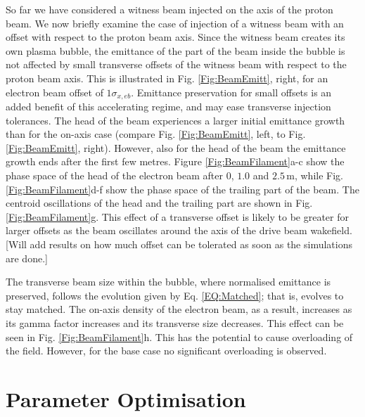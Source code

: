 \documentclass[aps,prstab,reprint,amsmath,amssymb,groupedaddress]{revtex4-1}
\newcommand{\unit}[1]{\,\mathrm{#1}}
\begin{document}
So far we have considered a witness beam injected on the axis of the proton beam. We now briefly examine the case of
injection of a witness beam with an offset with respect to the proton beam axis. Since the witness beam creates its own
plasma bubble, the emittance of the part of the beam inside the bubble is not affected by small transverse offsets of
the witness beam with respect to the proton beam axis. This is illustrated in Fig. \ref{Fig:BeamEmitt}, right, for an
electron beam offset of $1\sigma_{x,eb}$. Emittance preservation for small offsets is an added benefit of this
accelerating regime, and may ease transverse injection tolerances. The head of the beam experiences a larger initial
emittance growth than for the on-axis case (compare Fig. \ref{Fig:BeamEmitt}, left, to Fig. \ref{Fig:BeamEmitt}, right).
However, also for the head of the beam the emittance growth ends after the first few metres.
Figure \ref{Fig:BeamFilament}a-c show the phase space of the head of the electron beam after $0$, $1.0$ and
$2.5\unit{m}$, while Fig. \ref{Fig:BeamFilament}d-f show the phase space of the trailing part of the beam. The
centroid oscillations of the head and the trailing part are shown in Fig. \ref{Fig:BeamFilament}g. This effect of a
transverse offset is likely to be greater for larger offsets as the beam oscillates around the axis of the drive beam
wakefield. [Will add results on how much offset can be tolerated as soon as the simulations are done.]

The transverse beam size within the bubble, where normalised emittance is preserved, follows the evolution given by
Eq. \ref{EQ:Matched}; that is, evolves to stay matched. The on-axis density of the electron beam, as a result,
increases as its gamma factor increases and its transverse size decreases. This effect can be seen in Fig.
\ref{Fig:BeamFilament}h. This has the potential to cause overloading of the field. However, for the base case no
significant overloading is observed.  

\section{Parameter Optimisation}\label{S:PO}
\end{document}
